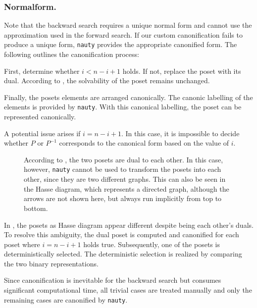 \documentclass[twoside,leqno,twocolumn]{article}
\begin{document}
\subsubsection{Normalform.} \label{sec:backward:normal_form}
Note that the backward search requires a unique normal form and cannot use the approximation used in the forward search.
If our custom canonification fails to produce a unique form, \texttt{nauty} provides the appropriate canonified form.
The following outlines the canonification process:

First, determine whether $i < n - i + 1$ holds.
If not, replace the poset with its dual.
According to , the solvability of the poset remains unchanged.

Finally, the posets elements are arranged canonically.
The canonic labelling of the elements is provided by \texttt{nauty}.
With this canonical labelling, the poset can be represented canonically.

A potential issue arises if $i = n - i + 1$.
In this case, it is impossible to decide whether $P$ or $P^{-1}$ corresponds to the canonical form based on the value of $i$.

\begin{figure}[!b]
  \centering
  
  \caption{According to , the two posets are dual to each other.
    In this case, however, \texttt{nauty} cannot be used to transform the posets into each other, since they are two different graphs. This can also be seen in the Hasse diagram, which represents a directed graph, although the arrows are not shown here, but always run implicitly from top to bottom.}
  \label{fig:backward_canonify_problematic}
\end{figure}


In , the posets as Hasse diagram appear different despite being each other's duals.
To resolve this ambiguity, the dual poset is computed and canonified for each poset where $i = n - i + 1$ holds true.
Subsequently, one of the posets is deterministically selected.
The deterministic selection is realized by comparing the two binary representations.

Since canonification is inevitable for the backward search but consumes significant computational time, all trivial cases are treated manually and only the remaining cases are canonified by \texttt{nauty}.
\end{document}
